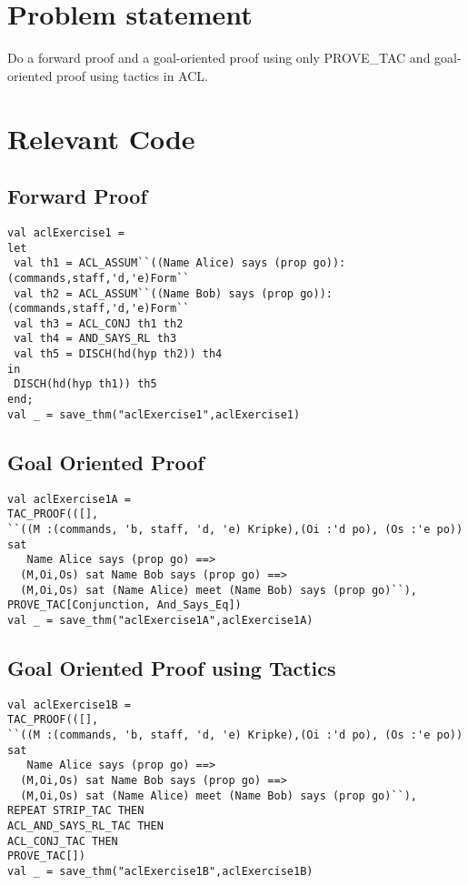 \documentclass{report}
\begin{document}
\section{Problem statement}
\label{problem-statement-13-1}
Do a forward proof and a goal-oriented proof using only PROVE_TAC and goal-oriented proof using tactics in ACL.
\begin{quote}
\HOLsolutionsOneTheoremsaclExerciseOne
\end{quote}

\section{Relevant Code}
\label{rel-code-13-1}

\subsection{Forward Proof}
\label{forward-proof-13-1}
\begin{lstlisting}[frame=TBlr]
val aclExercise1 =
let
 val th1 = ACL_ASSUM``((Name Alice) says (prop go)):(commands,staff,'d,'e)Form``
 val th2 = ACL_ASSUM``((Name Bob) says (prop go)):(commands,staff,'d,'e)Form``
 val th3 = ACL_CONJ th1 th2
 val th4 = AND_SAYS_RL th3
 val th5 = DISCH(hd(hyp th2)) th4
in
 DISCH(hd(hyp th1)) th5
end;
val _ = save_thm("aclExercise1",aclExercise1)
\end{lstlisting}

\subsection{Goal Oriented Proof}
\label{goal-oriented-proof-13-1}
\begin{lstlisting}[frame=TBlr]
val aclExercise1A =
TAC_PROOF(([],
``((M :(commands, 'b, staff, 'd, 'e) Kripke),(Oi :'d po), (Os :'e po)) sat
   Name Alice says (prop go) ==>
  (M,Oi,Os) sat Name Bob says (prop go) ==>
  (M,Oi,Os) sat (Name Alice) meet (Name Bob) says (prop go)``),
PROVE_TAC[Conjunction, And_Says_Eq])
val _ = save_thm("aclExercise1A",aclExercise1A)
\end{lstlisting}

\subsection{Goal Oriented Proof using Tactics}
\label{goal-oriented-proof-tacs-13-1}
\begin{lstlisting}[frame=TBlr]
val aclExercise1B = 
TAC_PROOF(([],
``((M :(commands, 'b, staff, 'd, 'e) Kripke),(Oi :'d po), (Os :'e po)) sat
   Name Alice says (prop go) ==>
  (M,Oi,Os) sat Name Bob says (prop go) ==>
  (M,Oi,Os) sat (Name Alice) meet (Name Bob) says (prop go)``),
REPEAT STRIP_TAC THEN
ACL_AND_SAYS_RL_TAC THEN
ACL_CONJ_TAC THEN
PROVE_TAC[])
val _ = save_thm("aclExercise1B",aclExercise1B)
\end{lstlisting}
\end{document}
